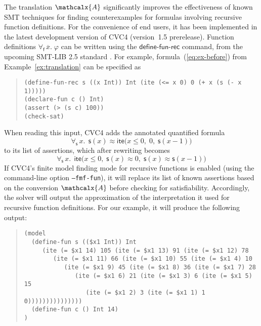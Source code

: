 \documentclass[runningheads,a4paper]{llncs}
\newcommand{\con}[1]{\mathsf{#1}}
\renewcommand\vec[1]{\overline{#1}}
\newcommand\cvc{CVC4\xspace}
\newcommand{\teq}{\approx}
\newcommand{\conv}{\mathcalx{A}}
\newcommand{\lite}{\con{ite}}
\newcommand{\forallf}[1]{\forall_{\!#1\:}}
\newcommand{\rem}[1]{\textcolor{red}{[#1]}}
\newcommand{\ajr}[1]{\rem{#1 --ajr}}
\newcommand{\jb}[1]{\rem{#1 --jb}}
\newcommand{\definefunreccmd}{\con{define}\text{-}\con{fun}\text{-}\con{rec}}
\begin{document}
The translation $\conv$ significantly improves the effectiveness of known SMT
techniques for finding counterexamples for formulas involving recursive
function definitions.
For the convenience of end users, it
has been implemented in the latest development version of \cvc %
(version~1.5 prerelease).
Function definitions $\forallf{\con{f}} \vec x.\; \varphi$ can be written using the $\definefunreccmd$ command,
from the upcoming SMT-LIB 2.5 standard \cite{smtlib25}.
For example, formula~(\ref{eq:ex-before}) from Example~\ref{ex:translation}
can be specified as
%
\begin{quote}
\begin{verbatim}
(define-fun-rec s ((x Int)) Int (ite (<= x 0) 0 (+ x (s (- x 1)))))
(declare-fun c () Int)
(assert (> (s c) 100))
(check-sat)
\end{verbatim}
\end{quote}
%
When reading this input,
\cvc adds the annotated quantified formula
$$\forallf{\con{s}} x.\;\, \con{s}( x ) \teq \lite\bigl( x \leq 0,\; 0,\; \con{s}( x-1 )\bigr)$$
to its list of assertions,
which after rewriting becomes
$$\forallf{\con{s}} x.\;\, \lite\bigl( x \leq 0,\; \con{s}( x ) \teq 0,\; \con{s}( x ) \teq \con{s}( x-1 ) \bigr)$$
If \cvc's finite model finding mode for recursive functions is enabled (using
the command-line option \texttt{--fmf-fun}), it will replace its list of known
assertions based on the conversion $\conv$ before checking for satisfiability.
Accordingly, the solver will output the approximation of the interpretation it
used for recursive function definitions. For our example, it will produce the following output:
%
\begin{quote}
\begin{verbatim}
(model
  (define-fun s (($x1 Int)) Int 
     (ite (= $x1 14) 105 (ite (= $x1 13) 91 (ite (= $x1 12) 78 
        (ite (= $x1 11) 66 (ite (= $x1 10) 55 (ite (= $x1 4) 10 
           (ite (= $x1 9) 45 (ite (= $x1 8) 36 (ite (= $x1 7) 28 
              (ite (= $x1 6) 21 (ite (= $x1 3) 6 (ite (= $x1 5) 15 
                 (ite (= $x1 2) 3 (ite (= $x1 1) 1 0)))))))))))))))
  (define-fun c () Int 14)
)
\end{verbatim}
\end{quote}
\end{document}
